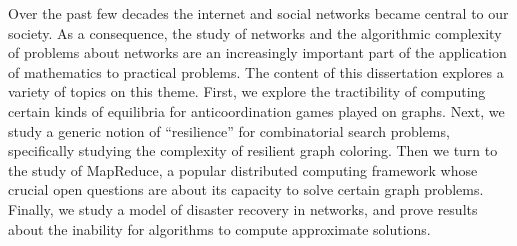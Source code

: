
Over the past few decades the internet and social networks became central to
our society.  As a consequence, the study of networks and the algorithmic
complexity of problems about networks are an increasingly important part of the
application of mathematics to practical problems. The content of this
dissertation explores a variety of topics on this theme. First, we explore the
tractibility of computing certain kinds of equilibria for anticoordination
games played on graphs. Next, we study a generic notion of ``resilience'' for
combinatorial search problems, specifically studying the complexity of
resilient graph coloring. Then we turn to the study of MapReduce, a popular
distributed computing framework whose crucial open questions are about its
capacity to solve certain graph problems. Finally, we study a model of disaster
recovery in networks, and prove results about the inability for algorithms to
compute approximate solutions. 
